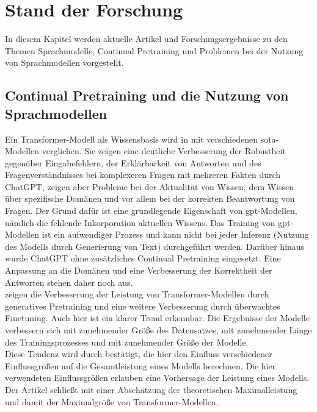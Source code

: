 \chapter{Stand der Forschung}\label{ch:relatedWork}
In diesem Kapitel werden aktuelle Artikel und Forschungsergebnisse zu den Themen Sprachmodelle, Continual Pretraining und Problemen bei der Nutzung von Sprachmodellen vorgestellt.

\section[Continual Pretraining]{Continual Pretraining und die Nutzung von Sprachmodellen}
Ein Transformer-Modell als Wissensbasis wird in \citet{chatgpt_qas} mit verschiedenen \ac{sota}-Modellen verglichen.
Sie zeigen eine deutliche Verbesserung der Robustheit gegenüber Eingabefehlern, der Erklärbarkeit von Antworten und des Fragenverständnisses bei komplexeren Fragen mit mehreren Fakten durch ChatGPT,
zeigen aber Probleme bei der Aktualität von Wissen, dem Wissen über spezifische Domänen und vor allem bei der korrekten Beantwortung von Fragen.
Der Grund dafür ist eine grundlegende Eigenschaft von \ac{gpt}-Modellen, nämlich die fehlende Inkorporation aktuellen Wissens.
Das Training von \ac{gpt}-Modellen ist ein aufwendiger Prozess und kann nicht bei jeder Inferenz (Nutzung des Modells durch Generierung von Text) durchgeführt werden.
Darüber hinaus wurde ChatGPT ohne zusätzliches Continual Pretraining eingesetzt.
Eine Anpassung an die Domänen und eine Verbesserung der Korrektheit der Antworten stehen daher noch aus.\\

\citet{gpt1} zeigen die Verbesserung der Leistung von Transformer-Modellen durch generatives Pretraining und eine weitere Verbesserung durch überwachtes Finetuning.
Auch hier ist ein klarer Trend erkennbar.
Die Ergebnisse der Modelle verbessern sich mit zunehmender Größe des Datensatzes, mit zunehmender Länge des Trainingsprozesses und mit zunehmender Größe der Modelle.\\

Diese Tendenz wird durch \citet{scaling_laws} bestätigt, die hier den Einfluss verschiedener Einflussgrößen auf die Gesamtleistung eines Modells berechnen.
Die hier verwendeten Einflussgrößen erlauben eine Vorhersage der Leistung eines Modells.
Der Artikel schließt mit einer Abschätzung der theoretischen Maximalleistung und damit der Maximalgröße von Transformer-Modellen.\\


